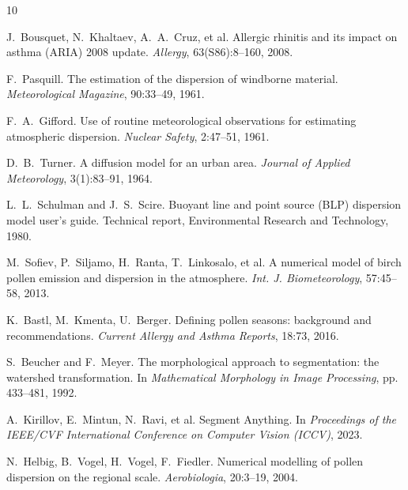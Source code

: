 \documentclass[11pt]{article}
\begin{document}
\begin{thebibliography}{10}

J.~Bousquet, N.~Khaltaev, A.~A.~Cruz, et al.
\newblock Allergic rhinitis and its impact on asthma (ARIA) 2008 update.
\newblock \emph{Allergy}, 63(S86):8--160, 2008.

F.~Pasquill.
\newblock The estimation of the dispersion of windborne material.
\newblock \emph{Meteorological Magazine}, 90:33--49, 1961.

F.~A.~Gifford.
\newblock Use of routine meteorological observations for estimating atmospheric dispersion.
\newblock \emph{Nuclear Safety}, 2:47--51, 1961.

D.~B.~Turner.
\newblock A diffusion model for an urban area.
\newblock \emph{Journal of Applied Meteorology}, 3(1):83--91, 1964.

L.~L.~Schulman and J.~S.~Scire.
\newblock Buoyant line and point source (BLP) dispersion model user's guide.
\newblock Technical report, Environmental Research and Technology, 1980.

M.~Sofiev, P.~Siljamo, H.~Ranta, T.~Linkosalo, et al.
\newblock A numerical model of birch pollen emission and dispersion in the atmosphere.
\newblock \emph{Int. J. Biometeorology}, 57:45--58, 2013.

K.~Bastl, M.~Kmenta, U.~Berger.
\newblock Defining pollen seasons: background and recommendations.
\newblock \emph{Current Allergy and Asthma Reports}, 18:73, 2016.

S.~Beucher and F.~Meyer.
\newblock The morphological approach to segmentation: the watershed transformation.
\newblock In \emph{Mathematical Morphology in Image Processing}, pp. 433--481, 1992.

A.~Kirillov, E.~Mintun, N.~Ravi, et al.
\newblock Segment Anything.
\newblock In \emph{Proceedings of the IEEE/CVF International Conference on Computer Vision (ICCV)}, 2023.

N.~Helbig, B.~Vogel, H.~Vogel, F.~Fiedler.
\newblock Numerical modelling of pollen dispersion on the regional scale.
\newblock \emph{Aerobiologia}, 20:3--19, 2004.


\end{thebibliography}
\end{document}

